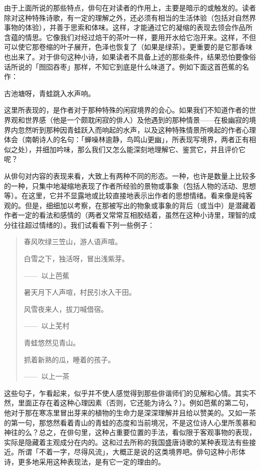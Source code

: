 {    由于上面所说的那些特点，俳句在对读者的作用上，主要是暗示的或触发的。读者除对这种特殊诗歌，有一定的理解之外，还必须有相当的生活体验（包括对自然界事物的体验），并善于思索和体味。这样，才能通过它的凝缩的表现去领会作品所含蕴的情思。它像我们对经过焙干的茶叶一样，要用开水给它泡开来。这样，不但可以使它那卷缩的叶子展开，色泽也恢复了（如果是绿茶）。更重要的是它那香味也出来了。对于俳句这种小诗，如果读者不具备上述的那些条件，结果恐怕要像俗话所说的「囫囵吞枣」那样，不知它到底是什么味道了。例如下面这首芭蕉的名作：

    \begin{center}
        古池塘呀，青蛙跳入水声响。\footnotemark[1]
    \end{center}


    这里所表现的，是作者对于那种特殊的闲寂境界的会心。如果我们不知道作者的世界观和世界感（他是一个颇耽闲寂的俳人）及他遇到的那种情景——在极幽寂的境界内忽然听到那种因青蛙跃入而响起的水声，以及这种特殊情景所唤起的作者心理体会（南朝诗人的名句：「蝉噪林逾静，鸟鸣山更幽」，所表现写境界，两者正有相似之处），并细加吟味，那么我们又怎么能深刻地理解它、鉴赏它，并且评价它呢？

    从俳句对内容的表现来看，大致上有两种不同的形态。一种，也许是数量上比较多的一种，只集中地凝缩地表现了作者所经验的景物或事象（包括人物的活动、思想等）。在这里，它并不显露地或比较直接地表示出作者的思想情绪。看来像是纯客观的。但是，细细加以考察，在那被写出的物象或事象的背后（或当中）是潜藏着作者一定的看法和感情的（两者又常常互相胶结着，虽然在这种小诗里，理智的成分往往超过情绪的）。我们试看看下列一些例子：
    \begin{quote}
        春风吹绿三笠山，游人语声喧。

        白雪之下，独活呀，冒出浅紫芽。

        \hfill——~以上芭蕉

        暑天月下人声喧，村民引水入干田。

        风雪夜来人，拔刀喊借宿。

        \hfill ——~以上芜村

        青蛙悠然见青山。

        抓着新熟的瓜，睡着的孩子。

        \hfill ——~以上一茶
    \end{quote}

    这些句子，乍看起来，似乎并不使人感觉得到那些俳谐师们的见解和心情。其实不然，里面正存在着这种心理因素（否则，它还能为诗么？）。例如芭蕉的第二句，他对于那在寒冻里冒出芽来的植物的生命力是深深理解并且给以赞美的。又如一茶的第一句，那悠然看着青山的青蛙的态度和当前境况，不是这位诗人心里所羡慕和神往的么？总之，在俳句里，这种占重要位置的手法，看似限于客观事物的表现，实际是隐藏着主观成分在内的。这和过去所称的我国盛唐诗歌的某种表现法有些接近。所谓「不着一字，尽得风流」，大概正是说的这类境界吧。俳句这种小形体诗，更多地采用这种表现法，是有它一定的理由的。

}
